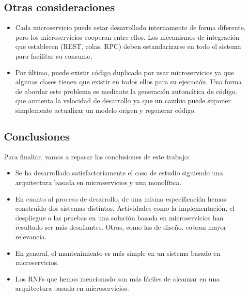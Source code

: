 \documentclass[11pt,a4paper]{article}
\begin{document}
\subsection{Otras consideraciones}

\begin{itemize}

\item Cada microservicio puede estar desarrollado internamente de forma diferente, pero los microservicios cooperan entre ellos. Los mecanismos de integración que establecen (REST, colas, RPC) deben estandarizarse en todo el sistema para facilitar su consumo.

\item Por último, puede existir código duplicado por usar microservicios ya que algunas clases tienen que existir en todos ellos para su ejecución. Una forma de abordar este problema es mediante la generación automática de código, que aumenta la velocidad de desarrollo ya que un cambio puede suponer simplemente actualizar un modelo origen y regenerar código.

\end{itemize}

\subsection{Conclusiones}

Para finaliar, vamos a repasar las conclusiones de este trabajo:

\begin{itemize}

\item Se ha desarrollado satisfactoriamente el caso de estudio siguiendo una arquitectura basada en microservicios y una monolítica.

\item En cuanto al proceso de desarrollo, de una misma especificación hemos construído dos sistemas distintos. Actividades como la implementación, el despliegue o las pruebas en una solución basada en microservicios han resultado ser más desafiantes. Otras, como las de diseño, cobran mayor relevancia.

\item En general, el mantenimiento es más simple en un sistema basado en microservicios.

\item Los RNFs que hemos mencionado son más fáciles de alcanzar en una arquitectura basada en microservicios.

\end{itemize}
\end{document}
